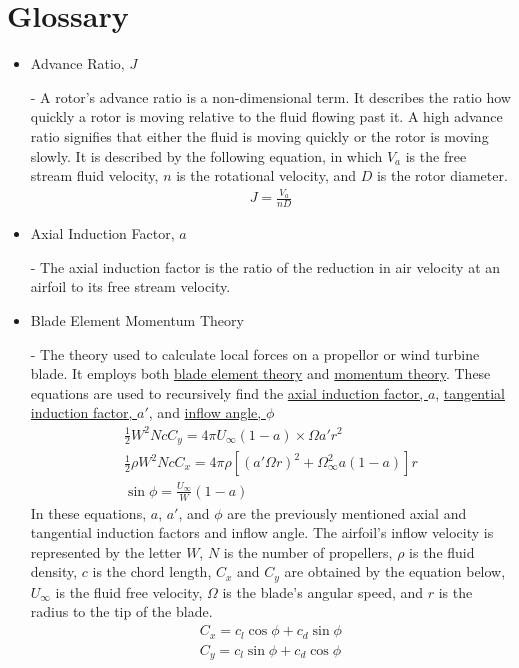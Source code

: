 \documentclass{article}
\begin{document}
\section{Glossary}
\begin{itemize}
	
	\item \hypertarget{J}{Advance Ratio, $J$} - A rotor's advance ratio is a non-dimensional term. It describes the ratio how quickly a rotor is moving relative to the fluid flowing past it. A high advance ratio signifies that either the fluid is moving quickly or the rotor is moving slowly. It is described by the following equation, in which $V_{a}$ is the free stream fluid velocity, $n$ is the rotational velocity, and $D$ is the rotor diameter.
	\begin{equation}
	\begin{aligned}
		J = \frac{V_{a}}{n D}
	\end{aligned}
	\end{equation}

	\item \hypertarget{a}{Axial Induction Factor, $a$} - The axial induction factor is the ratio of the reduction in air velocity at an airfoil to its free stream velocity.
	
	\item \hypertarget{BEM}{Blade Element Momentum Theory} - The theory used to calculate local forces on a propellor or wind turbine blade. It employs both \hyperlink{BET}{blade element theory} and \hyperlink{MT}{momentum theory}. These equations are used to recursively find the \hyperlink{a}{axial induction factor, $a$}, \hyperlink{a'}{tangential induction factor, $a'$}, and \hyperlink{phi}{inflow angle, $\phi$}
	\begin{equation}
	\begin{aligned}
		\frac{1}{2} W^{2} N c C_{y} = 4 \pi U_{\infty} (1 - a) \times \Omega a' r^{2} \\
		\frac{1}{2} \rho W^{2} N c C_{x} = 4 \pi \rho [(a' \Omega r)^{2} + \Omega^{2}_{\infty} a (1 - a)] r \\
		\sin \phi = \frac{U_{\infty}}{W} (1 - a)
	\end{aligned}
	\end{equation}
In these equations, $a$, $a'$, and $\phi$ are the previously mentioned axial and tangential induction factors and inflow angle. The airfoil's inflow velocity is represented by the letter $W$, $N$ is the number of propellers, $\rho$ is the fluid density, $c$ is the chord length, $C_{x}$ and $C_{y}$ are obtained by the equation below, $U_{\infty}$ is the fluid free velocity, $\Omega$ is the blade's angular speed, and $r$ is the radius to the tip of the blade.
	\begin{equation}
	\begin{aligned}
		C_{x} = c_{l} \cos{\phi} + c_{d} \sin{\phi} \\
		C_{y} = c_{l} \sin{\phi} + c_{d} \cos{\phi}
	\end{aligned}
	\end{equation}
	

\end{itemize}
\end{document}
